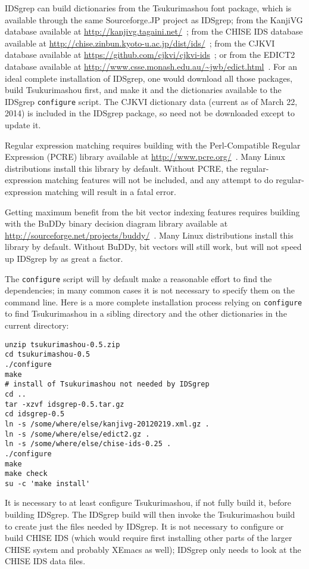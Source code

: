 \documentclass[twocolumn]{report}
\begin{document}
IDSgrep can build dictionaries
from the Tsukurimashou font package, which is available through the same
Sourceforge.JP project as IDSgrep;
from the KanjiVG database available at
\url{http://kanjivg.tagaini.net/}~\cite{KanjiVG};
from the CHISE IDS database available at
\url{http://chise.zinbun.kyoto-u.ac.jp/dist/ids/}~\cite{CHISE};
from the CJKVI database available at
\url{https://github.com/cjkvi/cjkvi-ids}~\cite{CJKVI};
or from the EDICT2 database available at
\url{http://www.csse.monash.edu.au/~jwb/edict.html}~\cite{EDICT2}.  For an
ideal complete installation of IDSgrep, one would download all those
packages, build Tsukurimashou first, and make it and the dictionaries
available to the IDSgrep \texttt{configure} script.
The CJKVI dictionary data (current as of March 22, 2014) is included in the
IDSgrep package, so need not be downloaded except to update it.

Regular expression matching requires building with the Perl-Compatible
Regular Expression (PCRE) library available at
\url{http://www.pcre.org/}~\cite{PCRE}.  Many Linux distributions install
this library by default.  Without PCRE, the regular-expression matching
features will not be included, and any attempt to do regular-expression
matching will result in a fatal error.

Getting maximum benefit from the bit vector indexing features requires
building with the BuDDy binary decision diagram library available at
\url{http://sourceforge.net/projects/buddy/}~\cite{BuDDy}.  Many Linux
distributions install this library by default.  Without BuDDy, bit vectors
will still work, but will not speed up IDSgrep by as great a factor.

The \texttt{configure}
script will by default make a reasonable effort to find the dependencies; in
many common cases it is not necessary to specify them on the command line. 
Here is a more complete installation process relying on \texttt{configure}
to find Tsukurimashou in a
sibling directory and the other dictionaries in the current directory:
\begin{verbatim}
unzip tsukurimashou-0.5.zip
cd tsukurimashou-0.5
./configure
make
# install of Tsukurimashou not needed by IDSgrep
cd ..
tar -xzvf idsgrep-0.5.tar.gz
cd idsgrep-0.5
ln -s /some/where/else/kanjivg-20120219.xml.gz .
ln -s /some/where/else/edict2.gz .
ln -s /some/where/else/chise-ids-0.25 .
./configure
make
make check
su -c 'make install'
\end{verbatim}

It is necessary to at least configure Tsukurimashou, if not fully build it,
before building IDSgrep.  The IDSgrep build will then invoke the
Tsukurimashou build to create just the files needed by IDSgrep.  It is not
necessary to configure or build CHISE IDS (which would require first
installing other parts of the larger CHISE system and probably XEmacs as
well); IDSgrep only needs to look at the CHISE IDS data files.
\end{document}
